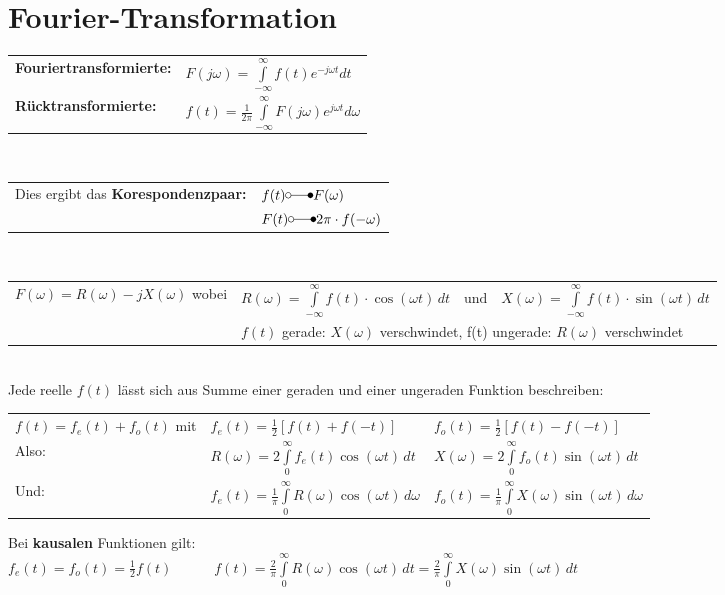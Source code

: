 \section{Fourier-Transformation}
\begin{tabular}{|p{6cm} l|} \hline
	\textbf{Fouriertransformierte:} &
	$F(j\omega) = \int\limits_{-\infty}^{\infty} f(t)e^{-j\omega t}dt$ \\
	\textbf{Rücktransformierte:} &
	$f(t) = \frac{1}{2\pi}\int\limits_{-\infty}^{\infty}F(j\omega)e^{j\omega t}d\omega$ \\ \hline
\end{tabular} \\
\begin{tabular}{p{6cm} l}
Dies ergibt das \textbf{Korespondenzpaar:}	& $f(t) \laplace F(\omega)$ \\
											 & $F(t) \laplace 2\pi \cdot f(-\omega)$ \\
\end{tabular} \\
\begin{tabular}{p{6cm} l}
$F(\omega) = R(\omega) -jX(\omega)$ wobei &
$R(\omega) = \int\limits_{-\infty}^\infty f(t)\cdot \cos(\omega t)\,dt \quad \text{und} \quad X(\omega) =
\int\limits_{-\infty}^\infty f(t)\cdot \sin(\omega t)\,dt$ \\
 & $f(t)$ gerade: $X(\omega)$ verschwindet, f(t) ungerade: $R(\omega)$ verschwindet \\
\end{tabular} \\

Jede reelle $f(t)$ lässt sich aus Summe einer geraden und einer ungeraden Funktion beschreiben:\\
\begin{tabular}{lll}
$f(t) = f_e(t) + f_o(t)$ mit & $f_e(t) = \frac{1}{2}[f(t) + f(-t)]$ & $f_o(t) = \frac{1}{2}[f(t) - f(-t)]$ \\

Also: & $R(\omega) = 2 \int\limits_0^\infty f_e(t) \cos(\omega t)\,dt$ & $X(\omega) = 2 \int\limits_0^\infty
f_o(t) \sin(\omega t)\,dt$ \\

Und: & $f_e(t) = \frac{1}{\pi}\int\limits_0^\infty R(\omega)\cos(\omega t)\,d\omega$ & 
$f_o(t) = \frac{1}{\pi}\int\limits_0^\infty X(\omega)\sin(\omega t)\,d\omega$ \\
\end{tabular}

Bei \textbf{kausalen} Funktionen gilt:\\
$f_e(t) = f_o(t) = \frac{1}{2}f(t) \quad \quad \quad
f(t) = \frac{2}{\pi}\int\limits_0^\infty R(\omega) \cos(\omega t)\,dt = \frac{2}{\pi}\int\limits_0^\infty X(\omega)
\sin(\omega t)\,dt$


